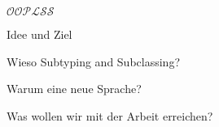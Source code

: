 \begin{frame}[t]{$\mathcal{OOPLSS}$}
  \begin{bigitemize}[<+->]{3mm}
		\item Idee und Ziel
		\item Wieso Subtyping and Subclassing?
		\item Warum eine neue Sprache?
		\item Was wollen wir mit der Arbeit erreichen?
	\end{bigitemize}
\end{frame}
